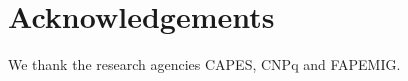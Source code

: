 \documentclass[sigconf]{acmart}
\begin{document}
\maketitle













\section*{Acknowledgements} We thank the research agencies CAPES, CNPq and FAPEMIG.

% 


 


% 
\end{document}
